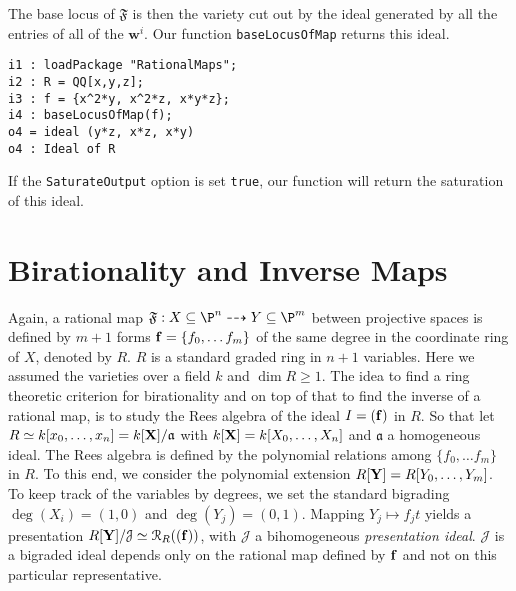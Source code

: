 \documentclass[11pt]{amsart}
\numberwithin{equation}{theorem}
\def\ff{{\bf f}}
\def\XX{{\bf X}}
\def\YY{{\bf Y}}
\renewcommand{\:}{\colon}
\theoremstyle{theorem}
\begin{document}
The base locus of $\mathfrak{F}$ is then the variety cut out by the ideal generated by all the entries of all of the $\mathbf w^i$. Our function {\tt baseLocusOfMap}  returns this ideal.
{\scriptsize\color{blue}
\begin{verbatim}
i1 : loadPackage "RationalMaps";
i2 : R = QQ[x,y,z];
i3 : f = {x^2*y, x^2*z, x*y*z};
i4 : baseLocusOfMap(f);
o4 = ideal (y*z, x*z, x*y)
o4 : Ideal of R
\end{verbatim}
}
{\normalsize}
If the \verb=SaturateOutput= option is set {\tt true}, our function will return the saturation of this ideal.


\section{Birationality and Inverse Maps}

Again, a rational map $\mathfrak{F}:X\subseteq \P^n\dasharrow Y \subseteq \P^m$ between projective spaces is defined by $m+1$ forms $\ff=\{f_0,\ldots f_m\}$ of the same degree in the coordinate ring of $X$, denoted by  $R$. $R$ is a standard graded ring in $n+1$ variables. Here we assumed the varieties over a field $k$ and  $\dim R\geq 1$.
The idea to find a ring theoretic criterion for birationality and on top of that to find the inverse of a rational map, is to study the Rees algebra of the ideal $I=(\ff)$ in $R$.
So that let  $R\simeq k[x_0,\ldots, x_n]=k[\XX]/\mathfrak{a}$ with $k[\XX]=k[X_0,\ldots, X_n]$ and $\mathfrak{a}$ a homogeneous ideal. The Rees algebra is defined by the polynomial relations among $\{f_0,\ldots f_m\}$ in $R$. To this end, we consider the polynomial extension $R[\YY]=R[Y_0,\ldots,Y_m]$. To keep track of the variables by degrees, we set the standard  bigrading $\deg(X_i)=(1,0)$ and $\deg(Y_j)=(0,1)$. Mapping $Y_j\mapsto f_jt$ yields
a presentation $R[\YY]/\mathcal{J}\simeq {\mathcal R}_R((\ff))$, with $\mathcal{J}$ a bihomogeneous {\em presentation
ideal}.
$\mathcal{J}$ is a bigraded ideal depends only on the rational map defined by $\ff$
and not on this particular representative.
\end{document}
